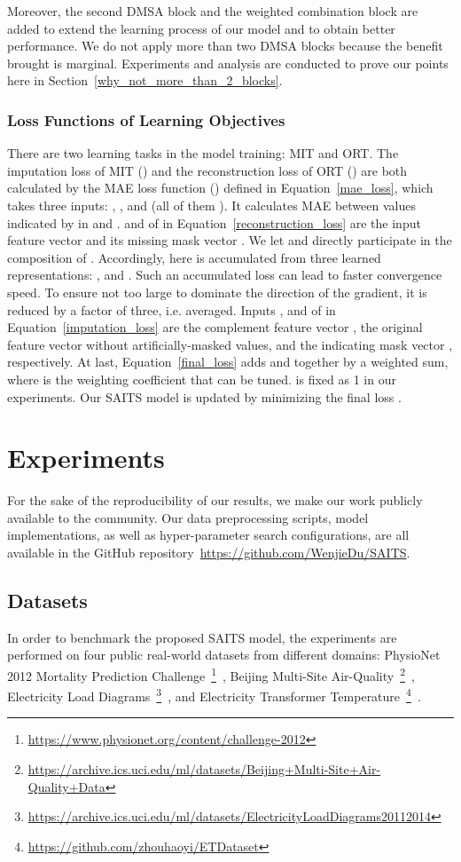 \documentclass{article}
\begin{document}
Moreover, the second DMSA block and the weighted combination block are added to extend the learning process of our model and to obtain better performance. We do not apply more than two DMSA blocks because the benefit brought is marginal. Experiments and analysis are conducted to prove our points here in Section~\ref{why_not_more_than_2_blocks}.

\subsubsection{Loss Functions of Learning Objectives} \label{SAITS: training loss}




There are two learning tasks in the model training: MIT and ORT. The imputation loss of MIT () and the reconstruction loss of ORT () are both calculated by the MAE loss function () defined in Equation~\ref{mae_loss}, which takes three inputs: , , and  (all of them ). It calculates MAE between values indicated by  in  and .  and  of  in Equation~\ref{reconstruction_loss} are the input feature vector  and its missing mask vector . We let  and  directly participate in the composition of . Accordingly, here  is accumulated from three learned representations: ,  and . Such an accumulated loss can lead to faster convergence speed. To ensure  not too large to dominate the direction of the gradient, it is reduced by a factor of three, i.e. averaged. Inputs ,  and  of  in Equation~\ref{imputation_loss} are the complement feature vector , the original feature vector  without artificially-masked values, and the indicating mask vector , respectively. At last, Equation~\ref{final_loss} adds  and  together by a weighted sum, where  is the weighting coefficient that can be tuned.  is fixed as 1 in our experiments. Our SAITS model is updated by minimizing the final loss .

\section{Experiments}\label{experiments}
For the sake of the reproducibility of our results, we make our work publicly available to the community. Our data preprocessing scripts, model implementations, as well as hyper-parameter search configurations, are all available in the GitHub repository~\url{https://github.com/WenjieDu/SAITS}.

\subsection{Datasets}
In order to benchmark the proposed SAITS model, the experiments are performed on four public real-world datasets from different domains: PhysioNet 2012 Mortality Prediction Challenge~\footnote{\url{https://www.physionet.org/content/challenge-2012}}~\cite{Silva2012ICU}, Beijing Multi-Site Air-Quality~\footnote{\url{https://archive.ics.uci.edu/ml/datasets/Beijing+Multi-Site+Air-Quality+Data}}~\cite{Zhang2017AirQuality}, Electricity Load Diagrams~\footnote{\url{https://archive.ics.uci.edu/ml/datasets/ElectricityLoadDiagrams20112014}}~\cite{Dua2017UCI}, and Electricity Transformer Temperature~\footnote{\url{https://github.com/zhouhaoyi/ETDataset}}~\cite{Zhou2021informer}.
\end{document}
